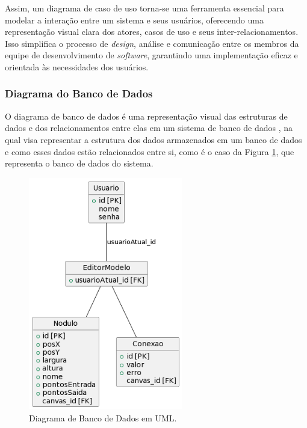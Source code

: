Assim, um diagrama de caso de uso torna-se uma ferramenta essencial para modelar a interação entre um sistema e seus usuários, oferecendo uma representação visual clara dos atores, casos de uso e seus inter-relacionamentos. Isso simplifica o processo de \textit{design}, análise e comunicação entre os membros da equipe de desenvolvimento de \textit{software}, garantindo uma implementação eficaz e orientada às necessidades dos usuários.
        
\subsubsection{Diagrama do Banco de Dados}

O diagrama de banco de dados é uma representação visual das estruturas de dados e dos relacionamentos entre elas em um sistema de banco de dados \cite{databasedepth}, na qual visa representar a estrutura dos dados armazenados em um banco de dados e como esses dados estão relacionados entre si, como é o caso da Figura \ref{fig:DatabaseDiagram}, que representa o banco de dados do sistema.
            
\begin{figure}[htb]
    \caption{\label{fig:DatabaseDiagram}Diagrama de Banco de Dados em UML.}
    \begin{center}
        \includegraphics[width=0.6\textwidth]{figuras/DatabaseDiagram.png}
    \end{center}
\end{figure}
            
